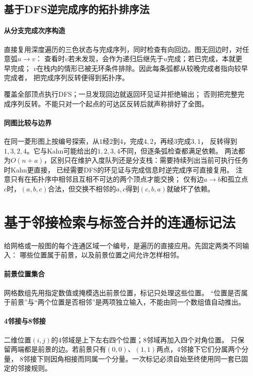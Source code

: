 \subsection{基于DFS逆完成序的拓扑排序法}

\paragraph{从分支完成次序构造}
直接复用深度遍历的三色状态与完成序列，同时检查有向回边。图无回边时，对任意弧$u\to v$：
查看时$v$若未发现，会作为递归后继先于$u$完成；若已完成，本就更早完成；
$v$在栈内的情形已被无环条件排除。因此每条弧都从较晚完成者指向较早完成者，
把完成序列反转便得到拓扑序。

\begin{algorithm}[DFS逆完成序拓扑排序]
  覆盖全部顶点执行DFS；一旦发现回边就返回环见证并拒绝输出；
  否则把完整完成序列反转。不能只对一个起点的可达区反转后就声称排好了全图。
\end{algorithm}

\paragraph{同图比较与边界}
在同一菱形图上按编号探索，从$1$经$2$到$4$，完成$4,2$，再经$3$完成$3,1$，
反转得到$1,3,2,4$。它与Kahn可能给出的$1,2,3,4$不同，但逐条弧检查都满足依赖。
两法都为$O(n+a)$，区别只在维护入度队列还是分支栈：需要持续列出当前可执行任务时Kahn更直接，
已经需要DFS的环见证与完成信息时逆完成序可直接复用。
注意只有在拓扑序中相邻且互相不可达的两个顶点才能交换；
仅有边$a\to b$和孤立点$c$时，$(a,b,c)$合法，但交换不相邻的$a,c$得到$(c,b,a)$就破坏了依赖。

\section{基于邻接检索与标签合并的连通标记法}

给网格或一般图的每个连通区域一个编号，是遍历的直接应用。先固定两类不同输入：
哪些位置属于前景，以及前景位置之间允许怎样相邻。

\paragraph{前景位置集合}
网格数组先用指定数值或掩模选出前景位置，标记只处理这些位置。
“位置是否属于前景”与“两个位置是否相邻”是两项独立输入，不能由同一个数组值自动推出。

\paragraph{4邻接与8邻接}
二维位置$(i,j)$的4邻域是上下左右四个位置；8邻域再加入四个对角位置。
只保留两端都是前景的边。若前景只有$(0,0)$、$(1,1)$两点，4邻接下它们分属两个分量，
8邻接下则因角相接而同属一个分量。一次标记必须自始至终使用同一套已固定的邻接规则。

